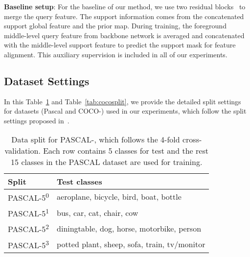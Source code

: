 \documentclass{article}
\begin{document}
\textbf{Baseline setup}: 
For the baseline of our method, we use two residual blocks~\cite{he2015resnet} to merge the query feature. The support information comes from the concatenated support global feature and the prior map. 
During training, the foreground middle-level query feature from backbone network is averaged and concatenated with the middle-level support feature to predict the support mask for feature alignment. This auxiliary supervision is included in all of our experiments. 

\subsection{Dataset Settings}
In this Table~\ref{tab:vocsplit} and Table~\ref{tab:cocosplit}, we provide the detailed split settings for datasets (Pascal  and COCO-) used in our experiments, which follow the split settings proposed in~\cite{nguyen2019FWB}.


\begin{table}[ht]
  \centering
  \begin{tabular}{l|l}
    \toprule[1pt]
    Split & Test classes \\ \hline
    PASCAL-5\textsuperscript{0} & aeroplane, bicycle, bird, boat, bottle \\
PASCAL-5\textsuperscript{1} & bus, car, cat, chair, cow \\
PASCAL-5\textsuperscript{2} & diningtable, dog, horse, motorbike, person \\
PASCAL-5\textsuperscript{3} & potted plant, sheep, sofa, train, tv/monitor \\
    \bottomrule[1pt]
  \end{tabular}
  \caption{Data split for  PASCAL-, which follows the 4-fold cross-validation. Each row contains 5 classes for test and the rest 15 classes in the PASCAL dataset are used for training.}\label{tab:vocsplit}
\end{table}
\end{document}
